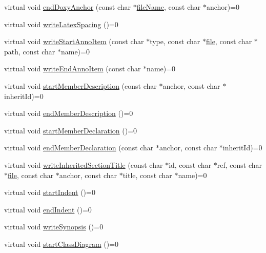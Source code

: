 \begin{DoxyCompactItemize}
\item 
virtual void \hyperlink{class_output_generator_a59ba4ed87cf4c2bb55f231679d52268a}{end\+Doxy\+Anchor} (const char $\ast$\hyperlink{class_output_generator_a9bb808101dbeae7732bb0fa66cad9176}{file\+Name}, const char $\ast$anchor)=0
\item 
virtual void \hyperlink{class_output_generator_afcb9acfea2d7a6f0a340287632aea4e8}{write\+Latex\+Spacing} ()=0
\item 
virtual void \hyperlink{class_output_generator_a2b0f7e8400fa8bfa7b973ed25f2c4366}{write\+Start\+Anno\+Item} (const char $\ast$type, const char $\ast$\hyperlink{class_output_generator_aed5ad11c3844cdf71ec6fee6c1c84286}{file}, const char $\ast$path, const char $\ast$name)=0
\item 
virtual void \hyperlink{class_output_generator_a29c6763f7d6f708fc5d3e7dc2c0ce1f4}{write\+End\+Anno\+Item} (const char $\ast$name)=0
\item 
virtual void \hyperlink{class_output_generator_a5b6d67bd4820cdd2fa503b0065615406}{start\+Member\+Description} (const char $\ast$anchor, const char $\ast$inherit\+Id)=0
\item 
virtual void \hyperlink{class_output_generator_af7f56035354567686d15ab77e1f6f31d}{end\+Member\+Description} ()=0
\item 
virtual void \hyperlink{class_output_generator_aeb5b5670178926771b6a649239f15444}{start\+Member\+Declaration} ()=0
\item 
virtual void \hyperlink{class_output_generator_af22783eb794097cdfb783cfb29f60f3e}{end\+Member\+Declaration} (const char $\ast$anchor, const char $\ast$inherit\+Id)=0
\item 
virtual void \hyperlink{class_output_generator_a272f99f415b7e8b6ead453cd9e714b8e}{write\+Inherited\+Section\+Title} (const char $\ast$id, const char $\ast$ref, const char $\ast$\hyperlink{class_output_generator_aed5ad11c3844cdf71ec6fee6c1c84286}{file}, const char $\ast$anchor, const char $\ast$title, const char $\ast$name)=0
\item 
virtual void \hyperlink{class_output_generator_a1fe795813bf725fb63b19a1cf463bdfa}{start\+Indent} ()=0
\item 
virtual void \hyperlink{class_output_generator_a6d0ae2ff84f31ce7c3d964668dc31154}{end\+Indent} ()=0
\item 
virtual void \hyperlink{class_output_generator_aa0d18fb8ce1251b97619c90061a697d8}{write\+Synopsis} ()=0
\item 
virtual void \hyperlink{class_output_generator_af4dbb13368da9a7fee2c7ed3bb4bd8ea}{start\+Class\+Diagram} ()=0

\end{DoxyCompactItemize}
